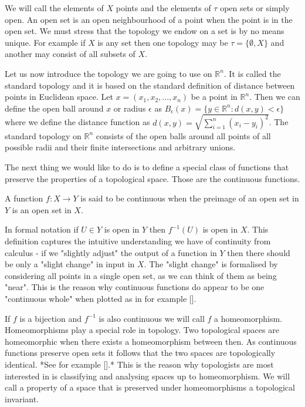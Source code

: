 We will call the elements of $X$ points and the elements of $\tau$ open sets or simply open. An open set is an open neighbourhood of a point when the point is in the open set. We must stress that the topology we endow on a set is by no means unique. For example if $X$ is any set then one topology may be $\tau = \{\emptyset, X\}$ and another may consist of all subsets of $X$. 

Let us now introduce the topology we are going to use on $\mathbb{R}^n$. It is called the standard topology and it is based on the standard definition of distance between points in Euclidean space. Let $x = (x_1, x_2, ..., x_n)$ be a point in $\mathbb{R}^n$. Then we can define the open ball around $x$ or radius $\epsilon$ as $B_\epsilon(x) = \{y \in \mathbb{R}^n: d(x, y) < \epsilon\}$ where we define the distance function as $d(x, y) = \sqrt{\sum_{i=1}^n{(x_i - y_i)^2}}$. The standard topology on $\mathbb{R}^n$ consists of the open balls around all points of all possible radii and their finite intersections and arbitrary unions.

The next thing we would like to do is to define a special class of functions that preserve the properties of a topological space. Those are the continuous functions.

\begin{defn} A function $f : X \to Y$ is said to be continuous when the preimage of an open set in $Y$ is an open set in $X$. \end{defn}

In formal notation if $U \in Y$ is open in $Y$ then $f^{-1}(U)$ is open in $X$. This definition captures the intuitive understanding we have of continuity from calculus - if we "slightly adjust" the output of a function in $Y$ then there should be only a "slight change" in input in $X$. The "slight change" is formalised by considering all points in a single open set, as we can think of them as being "near". This is the reason why continuous functions do appear to be one "continuous whole" when plotted as in for example []. 
    

If $f$ is a bijection and $f^{-1}$ is also continuous we will call $f$ a homeomorphism. Homeomorphisms play a special role in topology. Two topological spaces are homeomorphic when there exists a homeomorphism between then. As continuous functions preserve open sets it follows that the two spaces are topologically identical. *See for example [].*  This is the reason why topologists are most interested in is classifying and analysing spaces up to homeomorphism. We will call a property of a space that is preserved under homeomorphisms a topological invariant.

